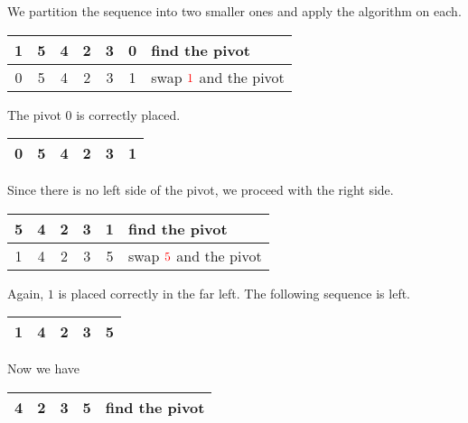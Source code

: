 We partition the sequence into two smaller ones and apply the algorithm on each.

\begin{center}
    \begin{tabular}{ | c | c | c | c | c | c | l | }
        \hline
        1 & 5 & 4 & 2 & 3 & \cellcolor{LightCyan}0 & find the {\color{cyan}pivot}\\ \hline
        \color{cyan}0 & 5 & 4 & 2 & 3 & \color{red}1 & swap \(\color{red}1\) and the {\color{cyan}pivot}\\ \hline
    \end{tabular}
\end{center}

The pivot \(0\) is correctly placed.

\begin{center}
    \begin{tabular}{ || c || c | c | c | c | c | }
        \hline
        \cellcolor{LightCyan}0 & 5 & 4 & 2 & 3 & 1 \\ \hline
    \end{tabular}
\end{center}

Since there is no left side of the pivot, we proceed with the right side.

\begin{center}
    \begin{tabular}{ | c | c | c | c | c | l | }
        \hline
        5 & 4 & 2 & 3 & \cellcolor{LightCyan}1 & find the {\color{cyan}pivot} \\ \hline
        \color{cyan}1 & 4 & 2 & 3 & \color{red}5 & swap \(\color{red}5\) and the {\color{cyan}pivot} \\ \hline
    \end{tabular}
\end{center}

Again, \(1\) is placed correctly in the far left. The following sequence is left.

\begin{center}
    \begin{tabular}{ | c | c | c | c | c | }
        \hline
        \cellcolor{LightCyan}1 & 4 & 2 & 3 & 5 \\ \hline
    \end{tabular}
\end{center}

Now we have

\begin{center}
    \begin{tabular}{ | c | c | c | c | l | }
        \hline
        4 & 2 & 3 & \cellcolor{LightCyan}5 & find the {\color{cyan}pivot} \\ \hline
    \end{tabular}
\end{center}

